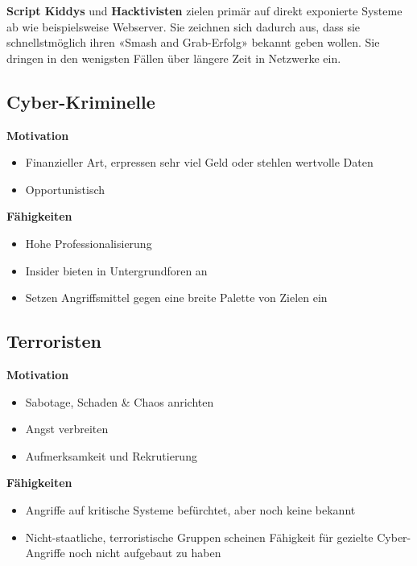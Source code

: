 \textbf{Script Kiddys} und \textbf{Hacktivisten} zielen primär auf direkt exponierte Systeme ab wie beispielsweise Webserver. Sie zeichnen sich dadurch aus, dass sie schnellstmöglich ihren «Smash and Grab-Erfolg» bekannt geben wollen. Sie dringen in den wenigsten Fällen über längere Zeit in Netzwerke ein.


\subsection{Cyber-Kriminelle}
\vspace{-8pt}
\begin{multicols*}{2}
    \textbf{Motivation}
    \begin{itemize}
        \item Finanzieller Art, erpressen sehr viel Geld oder stehlen wertvolle Daten
        \item Opportunistisch
    \end{itemize}
    \textbf{Fähigkeiten}
    \begin{itemize}
        \item Hohe Professionalisierung
        \item Insider bieten in Untergrundforen an
        \item Setzen Angriffsmittel gegen eine breite Palette von Zielen ein
    \end{itemize}
\end{multicols*}

\subsection{Terroristen}
\vspace{-8pt}
\begin{multicols*}{2}
    \textbf{Motivation}
    \begin{itemize}
        \item Sabotage, Schaden \& Chaos anrichten
        \item Angst verbreiten
        \item Aufmerksamkeit und Rekrutierung
    \end{itemize}
    \textbf{Fähigkeiten}
    \begin{itemize}
        \item Angriffe auf kritische Systeme befürchtet, aber noch keine bekannt
        \item Nicht-staatliche, terroristische Gruppen scheinen Fähigkeit für gezielte Cyber-Angriffe noch nicht aufgebaut zu haben
    \end{itemize}
\end{multicols*}
\vspace{-8pt}


